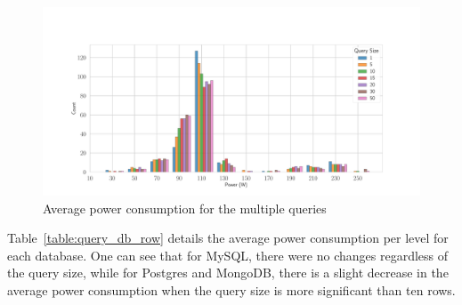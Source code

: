 \begin{figure}[hbt]
    \centering
    \includegraphics[width=\textwidth,height=\textheight,keepaspectratio]{imgs/histogram_av_power_cpu_query}
    \caption{Average power consumption for the multiple queries }
    \label{fig:av_power_query}
\end{figure}

Table~\ref{table:query_db_row} details the average power consumption per level for each database.
One can see that for MySQL, there were no changes regardless of the query size, while for Postgres and MongoDB, there is a slight decrease in the average power consumption when the query size is more significant than ten rows.

\begin{table}[bth]
    \raggedright
    \caption{Average power consumption of frameworks based on the database type}
    \label{table:query_db_row}
\end{table}

